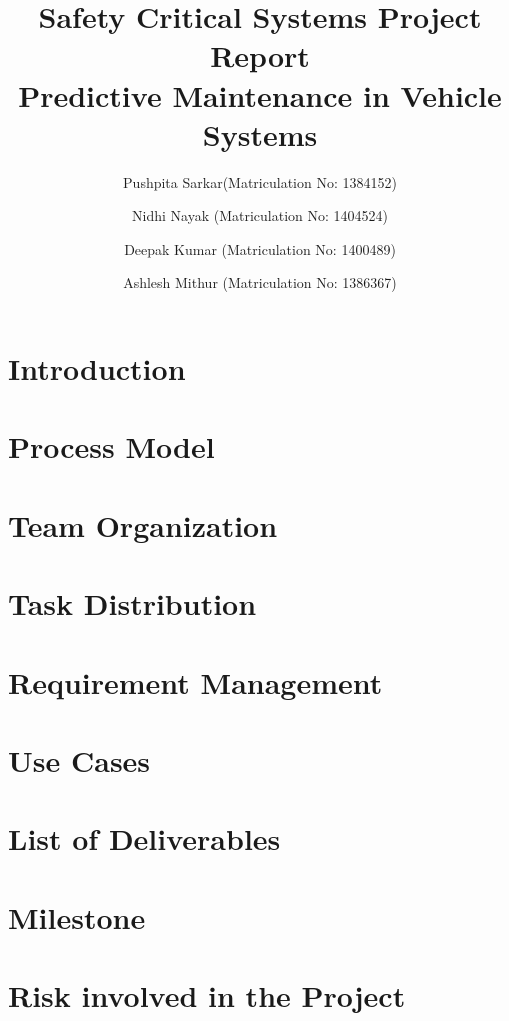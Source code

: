 \documentclass{llncs}
\title{Safety Critical Systems Project Report \\ Predictive Maintenance in Vehicle Systems}
\author{Pushpita Sarkar(Matriculation No: 1384152)\and Nidhi Nayak (Matriculation No: 1404524)\and Deepak Kumar (Matriculation No: 1400489)\and Ashlesh Mithur (Matriculation No: 1386367)}
\institute{Frankfurt University of Applied Sciences}
\begin{document}
\maketitle

%	


\section{Introduction}


\section{Process Model}


\section{Team Organization}


\section{Task Distribution}


\section{Requirement Management}


\section{Use Cases}


\section{List of Deliverables}


\section{Milestone}


\section{Risk involved in the Project}
 
\end{document}
